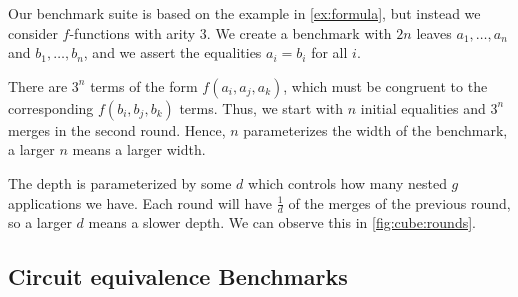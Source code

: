 Our benchmark suite is based on the example in \autoref{ex:formula}, but instead
we consider $f$-functions with arity $3$. We create a benchmark with $2n$ leaves
$a_1, \ldots, a_n$ and $b_1, \ldots, b_n$, and we assert the equalities $a_i =
b_i$ for all $i$. 



There are $3^n$ terms of the form $f(a_i, a_j, a_k)$, which must be congruent to
the corresponding $f(b_i, b_j, b_k)$ terms. Thus, we start with $n$ initial
equalities and $3^n$ merges in the second round. Hence, $n$ parameterizes the
width of the benchmark, a larger $n$ means a larger width.

The depth is parameterized by some $d$ which controls how many nested $g$
applications we have. Each round will have $\frac1d$ of the merges of the
previous round, so a larger $d$ means a slower depth. We can observe this in
\autoref{fig:cube:rounds}.







\subsection{Circuit equivalence Benchmarks}~\label{sec:eval:hardware}



